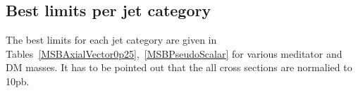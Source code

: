 \clearpage

\subsection{Best limits per jet category}

The best limits for each jet category are given in Tables~\ref{MSBAxialVector0p25},~\ref{MSBPseudoScalar} for various meditator and DM masses. It has to be pointed out that 
the all cross sections are normalied to 10pb.

\\





